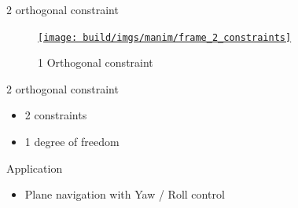 \documentclass[10pt, xcolor={usenames, dvipsnames}]{beamer}
\begin{document}
        \begin{frame}{2 orthogonal constraint}
            \begin{minipage}{0.33\textwidth}
                \begin{figure}
                    \centering
                    \href{run:frame_2_constraints.mp4?autostart&loop}{\texttt{[image: build/imgs/manim/frame\_2\_constraints]}}
                    \caption{1 Orthogonal constraint}
                \end{figure}
            \end{minipage}
            \hfill
            \begin{minipage}{0.6\textwidth}
                \begin{block}{2 orthogonal constraint}
                    \vspace*{.25cm}
                    \begin{itemize}
                        \item 2 constraints
                        \item 1 degree of freedom
                    \end{itemize}
                \end{block}
                \begin{block}{Application}
                    \begin{itemize}
                        \item Plane navigation with Yaw / Roll control
                    \end{itemize}
                \end{block}
            \end{minipage}
        \end{frame}
\end{document}
